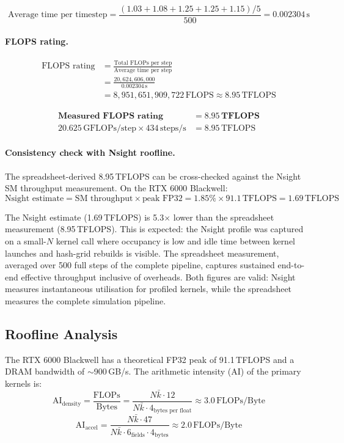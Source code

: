\documentclass[11pt,a4paper]{article}
\begin{document}
\[
  \text{Average time per timestep}
  = \frac{(1.03 + 1.08 + 1.25 + 1.25 + 1.15) / 5}{500}
  = 0.002304\,\text{s}
\]

\paragraph{FLOPS rating.}
\begin{align*}
  \text{FLOPS rating}
  &= \frac{\text{Total FLOPs per step}}{\text{Average time per step}} \\
  &= \frac{20{,}624{,}606{,}000}{0.002304\,\text{s}} \\
  &= 8{,}951{,}651{,}909{,}722\,\text{FLOPS}
   \approx 8.95\,\text{TFLOPS}
\end{align*}

\begin{align*}
  \textbf{Measured FLOPS rating} &= 8.95\,\textbf{TFLOPS} \\
  20.625\,\text{GFLOPs/step} \times 434\,\text{steps/s}
  &= 8.95\,\text{TFLOPS}
\end{align*}

\paragraph{Consistency check with Nsight roofline.}
The spreadsheet-derived 8.95\,TFLOPS can be cross-checked against the Nsight SM
throughput measurement. On the RTX 6000 Blackwell:
\[
  \text{Nsight estimate}
  = \text{SM throughput} \times \text{peak FP32}
  = 1.85\% \times 91.1\,\text{TFLOPS}
  = 1.69\,\text{TFLOPS}
\]

The Nsight estimate (1.69\,TFLOPS) is 5.3$\times$ lower than the spreadsheet
measurement (8.95\,TFLOPS). This is expected: the Nsight profile was captured on
a small-$N$ kernel call where occupancy is low and idle time between kernel
launches and hash-grid rebuilds is visible. The spreadsheet measurement,
averaged over 500 full steps of the complete pipeline, captures sustained
end-to-end effective throughput inclusive of overheads. Both figures are valid:
Nsight measures instantaneous utilisation for profiled kernels, while the
spreadsheet measures the complete simulation pipeline.

\subsection{Roofline Analysis}

The RTX 6000 Blackwell has a theoretical FP32 peak of 91.1\,TFLOPS and a DRAM
bandwidth of $\sim$900\,GB/s. The arithmetic intensity (AI) of the primary
kernels is:
\[
  \text{AI}_{\text{density}}
  = \frac{\text{FLOPs}}{\text{Bytes}}
  = \frac{N \bar{k} \cdot 12}{N \bar{k} \cdot 4_{\text{bytes per float}}}
  \approx 3.0\,\text{FLOPs/Byte}
\]
\[
  \text{AI}_{\text{accel}}
  = \frac{N \bar{k} \cdot 47}{N \bar{k} \cdot 6_{\text{fields}} \cdot 4_{\text{bytes}}}
  \approx 2.0\,\text{FLOPs/Byte}
\]
\end{document}
